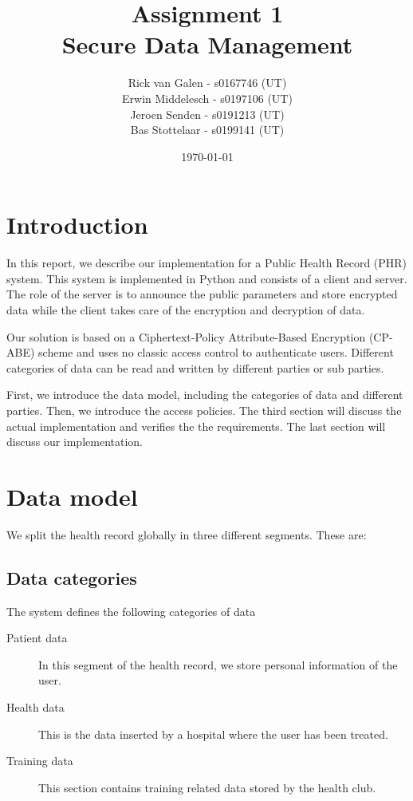 \documentclass[a4paper]{article}
\begin{document}
\title{Assignment 1 \\ Secure Data Management}
\author{Rick van Galen - s0167746 (UT) \\ Erwin Middelesch - s0197106 (UT) \\ Jeroen Senden - s0191213 (UT) \\ Bas Stottelaar - s0199141 (UT)}
\date{\today}
\maketitle

\section{Introduction}
	In this report, we describe our implementation for a Public Health Record (PHR) system. This system is implemented in Python and consists of a client and server. The role of the server is to announce the public parameters and store encrypted data while the client takes care of the encryption and decryption of data.

	Our solution is based on a Ciphertext-Policy Attribute-Based Encryption (CP-ABE) scheme and uses no classic access control to authenticate users. Different categories of data can be read and written by different parties or sub parties.
	
	First, we introduce the data model, including the categories of data and different parties. Then, we introduce the access policies. The third section will discuss the actual implementation and verifies the the requirements. The last section will discuss our implementation.

\section{Data model}
	We split the health record globally in three different segments. These are: 

	\subsection{Data categories}
		The system defines the following categories of data
		
		\begin{description}
		    \item[Patient data]
		    In this segment of the health record, we store personal information of the user. 
		    \item[Health data]
		    This is the data inserted by a hospital where the user has been treated.
		    \item[Training data]
		    This section contains training related data stored by the health club.
		\end{description}
		
\end{document}
